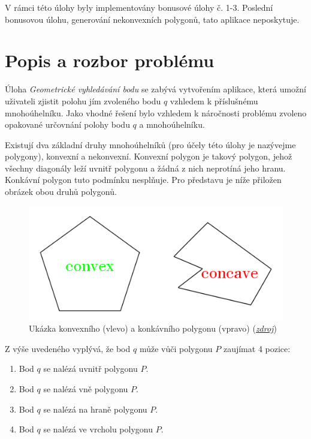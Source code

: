 \documentclass[a4paper, 12pt]{article}
\begin{document}
V rámci této úlohy byly implementovány bonusové úlohy č. 1-3. Poslední bonusovou úlohu, generování nekonvexních polygonů, tato aplikace neposkytuje.
\clearpage

\section{Popis a rozbor problému}
Úloha \textit{Geometrické vyhledávání bodu} se zabývá vytvořením aplikace, která umožní uživateli zjistit polohu jím zvoleného bodu $q$ vzhledem k příslušnému mnohoúhelníku. Jako vhodné řešení bylo vzhledem k náročnosti problému zvoleno opakované určovnání polohy bodu $q$ a mnohoúhelníku.

Existují dva základní druhy mnohoúhelníků (pro účely této úlohy je nazývejme polygony), konvexní a nekonvexní. Konvexní polygon je takový polygon, jehož všechny diagonály leží uvnitř polygonu a žádná z nich neprotíná jeho hranu. Konkávní polygon tuto podmínku nesplňuje. Pro představu je níže přiložen obrázek obou druhů polygonů.

\begin{figure}[h!]
	\centering
	\includegraphics[width=13cm]{./pictures/convex_concave.png}
	\caption{Ukázka konvexního (vlevo) a konkávního polygonu (vpravo) (\href{https://www.nextgurukul.in/nganswers/ask-question/answer/What-is-concave-38-convex-polygon-/Understanding-Quadrilaterals/75323.htm}{\textsl{zdroj}})}
\end{figure}

Z výše uvedeného vyplývá, že bod $q$ může vůči polygonu $P$ zaujímat 4 pozice:
\begin{enumerate}
\item Bod $q$ se nalézá uvnitř polygonu $P$.
\item Bod $q$ se nalézá vně polygonu $P$.
\item Bod $q$ se nalézá na hraně polygonu $P$.
\item Bod $q$ se nalézá ve vrcholu polygonu $P$.
\end{enumerate}
\end{document}
